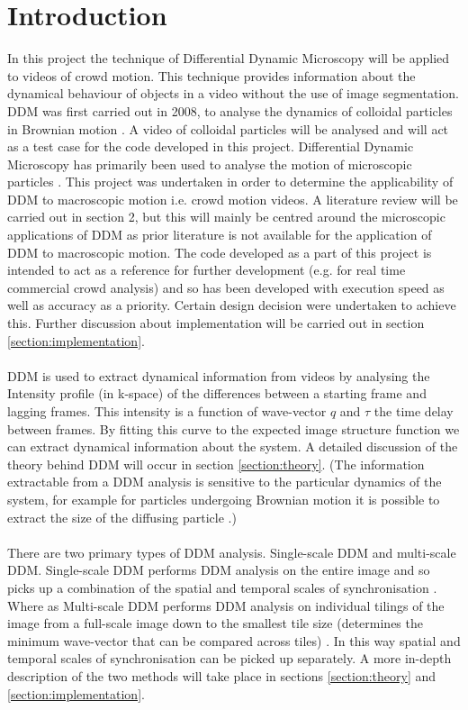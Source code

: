 \documentclass[10pt]{article}
\begin{document}
\clearpage
\tableofcontents

\clearpage
\section{Introduction}
In this project the technique of Differential Dynamic Microscopy will be applied to videos of crowd motion. This technique provides information about the dynamical behaviour of objects in a video without the use of image segmentation. DDM was first carried out in 2008, to analyse the dynamics of colloidal particles in Brownian motion \cite{ddm0}. A video of colloidal particles will be analysed and will act as a test case for the code developed in this project. Differential Dynamic Microscopy has primarily been used to analyse the motion of microscopic particles \cite{ddm1} \cite{ddm2}. This project was undertaken in order to determine the applicability of DDM to macroscopic motion i.e. crowd motion videos. A literature review will be carried out in section 2, but this will mainly be centred around the microscopic applications of DDM as prior literature is not available for the application of DDM to macroscopic motion. The code developed as a part of this project is intended to act as a reference for further development (e.g. for real time commercial crowd analysis) and so has been developed with execution speed as well as accuracy as a priority. Certain design decision were undertaken to achieve this. Further discussion about implementation will be carried out in section \ref{section:implementation}.
\\\\
DDM is used to extract dynamical information from videos by analysing the Intensity profile (in k-space) of the differences between a starting frame and lagging frames. This intensity is a function of wave-vector $q$ and $\tau$ the time delay between frames. By fitting this curve to the expected image structure function we can extract dynamical information about the system. A detailed discussion of the theory behind DDM will occur in section \ref{section:theory}. (The information extractable from a DDM analysis is sensitive to the particular dynamics of the system, for example for particles undergoing Brownian motion it is possible to extract the size of the diffusing particle \cite{ddm1}.)
\\\\
There are two primary types of DDM analysis. Single-scale DDM and multi-scale DDM. Single-scale DDM performs DDM analysis on the entire image and so picks up a combination of the spatial and temporal scales of synchronisation \cite{ddm2}. Where as Multi-scale DDM performs DDM analysis on individual tilings of the image from a full-scale image down to the smallest tile size (determines the minimum wave-vector that can be compared across tiles) \cite{ddm2}. In this way spatial and temporal scales of synchronisation can be picked up separately. A more in-depth description of the two methods will take place in sections \ref{section:theory} and \ref{section:implementation}.  
\end{document}
